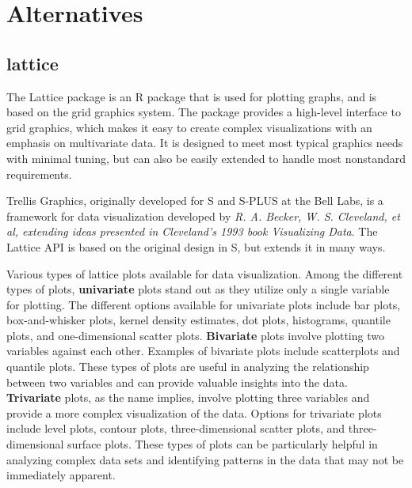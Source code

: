 \documentclass[
]{book}
\begin{document}
\hypertarget{alternatives-1}{%
\section{Alternatives}\label{alternatives-1}}

\hypertarget{lattice}{%
\subsection*{lattice}\label{lattice}}

The Lattice package is an R package that is used for plotting graphs, and is based on the grid graphics system. The package provides a high-level interface to grid graphics, which makes it easy to create complex visualizations with an emphasis on multivariate data. It is designed to meet most typical graphics needs with minimal tuning, but can also be easily extended to handle most nonstandard requirements.

Trellis Graphics, originally developed for S and S-PLUS at the Bell Labs, is a framework for data visualization developed by \emph{R. A. Becker, W. S. Cleveland, et al, extending ideas presented in Cleveland's 1993 book Visualizing Data}. The Lattice API is based on the original design in S, but extends it in many ways.

Various types of lattice plots available for data visualization. Among the different types of plots, \textbf{univariate} plots stand out as they utilize only a single variable for plotting. The different options available for univariate plots include bar plots, box-and-whisker plots, kernel density estimates, dot plots, histograms, quantile plots, and one-dimensional scatter plots. \textbf{Bivariate} plots involve plotting two variables against each other. Examples of bivariate plots include scatterplots and quantile plots. These types of plots are useful in analyzing the relationship between two variables and can provide valuable insights into the data. \textbf{Trivariate} plots, as the name implies, involve plotting three variables and provide a more complex visualization of the data. Options for trivariate plots include level plots, contour plots, three-dimensional scatter plots, and three-dimensional surface plots. These types of plots can be particularly helpful in analyzing complex data sets and identifying patterns in the data that may not be immediately apparent.
\end{document}

